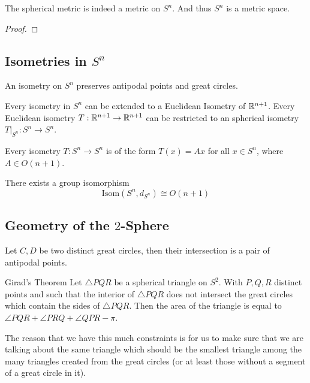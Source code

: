 \documentclass[a4paper]{article}
\begin{document}
\begin{prp}{}{} The spherical metric is indeed a metric on $S^n$. And thus $S^n$ is a metric space. \tcbline
\begin{proof}
\end{proof}
\end{prp}

\subsection{Isometries in $S^n$}
\begin{prp}{}{} An isometry on $S^n$ preserves antipodal points and great circles. 
\end{prp}

\begin{prp}{}{} Every isometry in $S^n$ can be extended to a Euclidean Isometry of $\mathbb{R}^{n+1}$. Every Euclidean isometry $T:\mathbb{R}^{n+1}\to\mathbb{R}^{n+1}$ can be restricted to an spherical isometry $T|_{S^n}:S^n\to S^n$. 
\end{prp}

\begin{prp}{}{} Every isometry $T:S^n\to S^n$ is of the form $T(x)=Ax$ for all $x\in S^n$, where $A\in O(n+1)$. 
\end{prp}

\begin{crl}{}{} There exists a group isomorphism $$\text{Isom}(S^n,d_{S^n})\cong O(n+1) $$
\end{crl}

\subsection{Geometry of the $2$-Sphere}
\begin{prp}{}{} Let $C,D$ be two distinct great circles, then their intersection is a pair of antipodal points. 
\end{prp}

\begin{thm}{Girad's Theorem}{} Let $\triangle PQR$ be a spherical triangle on $S^2$. With $P,Q,R$ distinct points and such that the interior of $\triangle PQR$ does not intersect the great circles which contain the sides of $\triangle PQR$. Then the area of the triangle is equal to $\angle PQR+\angle PRQ+\angle QPR-\pi$. 
\end{thm}

The reason that we have this much constraints is for us to make sure that we are talking about the same triangle which should be the smallest triangle among the many triangles created from the great circles (or at least those without a segment of a great circle in it). 
\end{document}
